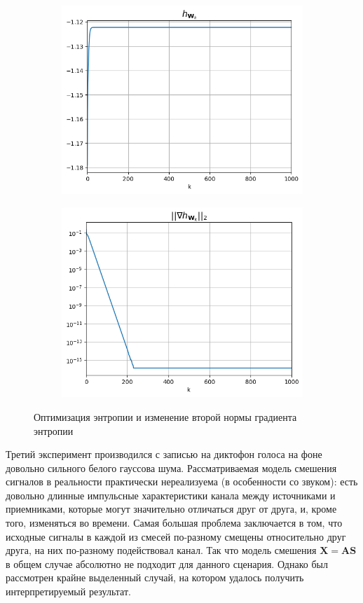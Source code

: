 \documentclass[a4paper,12pt]{article}
\begin{document}
	
	\begin{figure}[h!]
		\centering
		\begin{subfigure}{0.3\linewidth}
			\includegraphics[width=\linewidth]{plots/h1}
		\end{subfigure}
		\begin{subfigure}{0.3\linewidth}
			\includegraphics[width=\linewidth]{plots/grad1}
		\end{subfigure}
		\caption{Оптимизация энтропии и изменение второй нормы градиента энтропии}
	\end{figure}
	
	Третий эксперимент производился с записью на диктофон голоса на фоне довольно сильного белого гауссова шума. Рассматриваемая модель смешения сигналов в реальности практически нереализуема (в особенности со звуком): есть довольно длинные импульсные характеристики канала между источниками и приемниками, которые могут значительно отличаться друг от друга, и, кроме того, изменяться во времени. Самая большая проблема заключается в том, что исходные сигналы в каждой из смесей по-разному смещены относительно друг друга, на них по-разному подействовал канал. Так что модель смешения $\mathbf{X} = \mathbf{A} \mathbf{S}$ в общем случае абсолютно не подходит для данного сценария. Однако был рассмотрен крайне выделенный случай, на котором удалось получить интерпретируемый результат.
	
\end{document}
